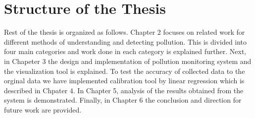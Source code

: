 \section{Structure of the Thesis}

Rest of the thesis is organized as follows. Chapter 2 focuses on related work for different methods of understanding and detecting pollution. This is divided into four main categories and  work done in each category is explained further. Next, in Chapeter 3 the design and implementation of pollution monitoring system and the visualization tool is explained. To test the accuracy of collected data to the orginal data we have implemented calibration tool by linear regression which is described in Chpater 4. In Chapter 5, analysis of the results obtained from the system is demonstrated. Finally, in Chapter 6 the conclusion and direction for future work are provided.